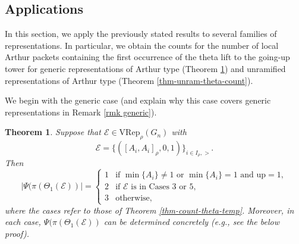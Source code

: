 \documentclass[11pt,letterpaper]{amsart}
\newcommand{\VRep}{{\mathrm{VRep}}}
\newcommand{\up}{{\mathrm{up}}}
\newcommand{\EE}{\mathcal{E}}
\newtheorem{thm}{Theorem}[section]
\numberwithin{equation}{section}
\begin{document}
\subsection{Applications}
In this section, we apply the previously stated results to several families of representations. In particular, we obtain the counts for the number of local Arthur packets containing the first occurrence of the theta lift to the going-up tower for generic representations of Arthur type (Theorem \ref{thm-generic-theta-count}) and unramified representations of Arthur type (Theorem \ref{thm-unram-theta-count}).

We begin with the generic case (and explain why this case covers generic representations in Remark \ref{rmk generic}).

\begin{thm}\label{thm-generic-theta-count}
    Suppose that $\EE\in\VRep_\rho(G_n)$ with
    \[
    \EE=\{([A_i,A_i]_\rho,0,1)\}_{i\in I_\rho,>}.
    \]
    Then
    \[
    |\Psi(\pi(\Theta_1(\EE))|=\begin{cases}
        1 & \text{if $\min\{A_i\}\neq 1$ or $\min\{A_i\}=1$ and $\up=1$}, \\
        2 & \text{if $\EE$ is in Cases 3 or 5}, \\
        3 & \text{otherwise},
    \end{cases}
    \]
    where the cases refer to those of Theorem \ref{thm-count-theta-temp}. Moreover, in each case, $\Psi(\pi(\Theta_1(\EE))$ can be determined concretely (e.g., see the below proof).
\end{thm}
\end{document}
